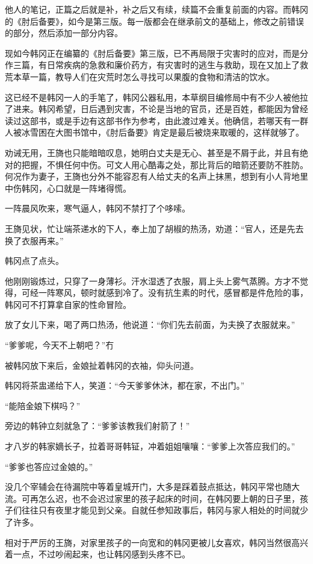 他人的笔记，正篇之后就是补，补之后又有续，续篇不会重复前面的内容。而韩冈的《肘后备要》，如今是第三版。每一版都会在继承前文的基础上，修改之前错误的部分，然后添加一部分内容。

现如今韩冈正在编纂的《肘后备要》第三版，已不再局限于灾害时的应对，而是分作三篇，有日常疾病的急救和廉价药方，有灾害时的逃生与救助，现在又加上了救荒本草一篇，教导人们在灾荒时怎么寻找可以果腹的食物和清洁的饮水。

这已经不是韩冈一人的手笔了，韩冈公器私用，本草纲目编修局中有不少人被他拉了进来。韩冈希望，日后遇到灾害，不论是当地的官员，还是百姓，都能因为曾经读过这部书，或是手边有这部书作为参考，由此渡过难关。他确信，若哪天有一群人被冰雪困在大图书馆中，《肘后备要》肯定是最后被烧来取暖的，这样就够了。

劝诫无用，王旖也只能暗暗叹息，她明白丈夫是无心、甚至是不屑于此，并且有绝对的把握，不惧任何中伤。可文人用心酷毒之处，那比背后的暗箭还要防不胜防。何况作为妻子，王旖也分外不能容忍有人给丈夫的名声上抹黑，想到有小人背地里中伤韩冈，心口就是一阵堵得慌。

一阵晨风吹来，寒气逼人，韩冈不禁打了个哆嗦。

王旖见状，忙让端茶递水的下人，奉上加了胡椒的热汤，劝道：“官人，还是先去换了衣服再来。”

韩冈点了点头。

他刚刚锻炼过，只穿了一身薄衫。汗水湿透了衣服，肩上头上雾气蒸腾。方才不觉得，可经一阵寒风，顿时就感到冷了。没有抗生素的时代，感冒都是件危险的事，韩冈可不打算拿自家的性命冒险。

放了女儿下来，喝了两口热汤，他说道：“你们先去前面，为夫换了衣服就来。”

“爹爹呢，今天不上朝吧？”冇

被韩冈放下来后，金娘扯着韩冈的衣袖，仰头问道。

韩冈将茶盅递给下人，笑道：“今天爹爹休沐，都在家，不出门。”

“能陪金娘下棋吗？”

旁边的韩钟立刻就急了：“爹爹该教我们射箭了！”

才八岁的韩家嫡长子，拉着哥哥韩钲，冲着姐姐嚷嚷：“爹爹上次答应我们的。”

“爹爹也答应过金娘的。”

没几个宰辅会在待漏院中等着皇城开门，大多是踩着鼓点抵达，韩冈平常也随大流。可再怎么迟，也不会迟过家里的孩子起床的时间，在韩冈要上朝的日子里，孩子们往往只有夜里才能见到父亲。自就任参知政事后，韩冈与家人相处的时间就少了许多。

相对于严厉的王旖，对家里孩子的一向宽和的韩冈更被儿女喜欢，韩冈当然很高兴着一点，不过吵闹起来，也让韩冈感到头疼不已。

